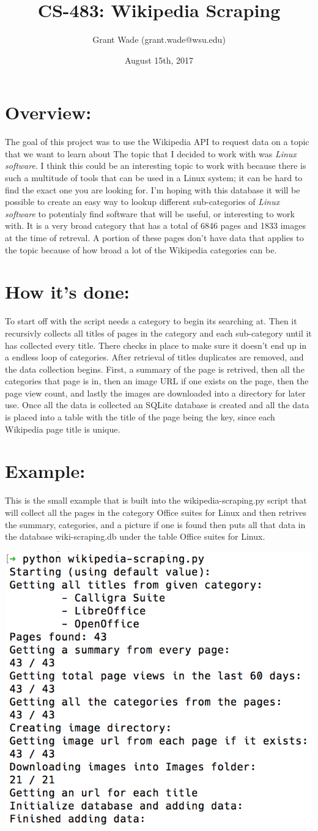 \documentclass{article}
\title{\textbf{CS-483: Wikipedia Scraping}}
\author{Grant Wade (grant.wade@wsu.edu)}
\date{August 15th, 2017}
\begin{document}
\maketitle

\section*{Overview:}
The goal of this project was to use the Wikipedia API to request data on
a topic that we want to learn about The topic that I decided to work with
was \textit{Linux software}. I think this could be an interesting topic to
work with because there is such a multitude of tools that can be used in a
Linux system; it can be hard to find the exact one you are looking for.
I'm hoping with this database it will be possible to create an easy way to
lookup different sub-categories of \textit{Linux software} to potentialy 
find software that will be useful, or interesting to work with. It is a very
broad category that has a total of 6846 pages and 1833 images at the time
of retreval. A portion of these pages don't have data that applies to the
topic because of how broad a lot of the Wikipedia categories can be.

\section*{How it's done:}
To start off with the script needs a category to begin its searching at.
Then it recursivly collects all titles of pages in the category and each
sub-category until it has collected every title. There checks in place to
make sure it doesn't end up in a endless loop of categories. After retrieval
of titles duplicates are removed, and the data collection begins. First, a
summary of the page is retrived, then all the categories that page is in,
then an image URL if one exists on the page, then the page view count, 
and lastly the images are downloaded into a directory for later use. 
Once all the data is collected an SQLite database is created and all the
data is placed into a table with the title of the page being the key,
since each Wikipedia page title is unique.

\section*{Example:}
This is the small example that is built into the wikipedia-scraping.py
script that will collect all the pages in the category Office suites for Linux
and then retrives the summary, categories, and a picture if one is found
then puts all that data in the database wiki-scraping.db under the table
Office suites for Linux.

\begin{center}
\includegraphics[width=.4\textwidth]{example.png}
\end{center}
\end{document}
